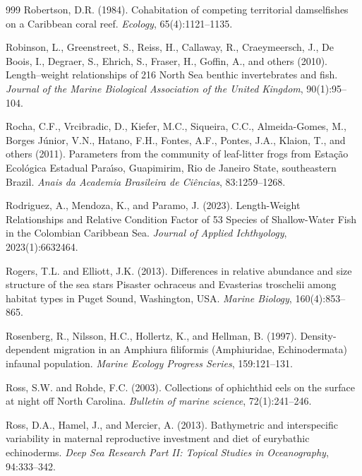 \begin{thebibliography}{999}
Robertson, D.R. (1984). Cohabitation of competing territorial damselfishes on a Caribbean coral reef. \textit{Ecology}, 65(4):1121--1135.

Robinson, L., Greenstreet, S., Reiss, H., Callaway, R., Craeymeersch, J., De Boois, I., Degraer, S., Ehrich, S., Fraser, H., Goffin, A., and others (2010). Length--weight relationships of 216 North Sea benthic invertebrates and fish. \textit{Journal of the Marine Biological Association of the United Kingdom}, 90(1):95--104.

Rocha, C.F., Vrcibradic, D., Kiefer, M.C., Siqueira, C.C., Almeida-Gomes, M., Borges J{\'u}nior, V.N., Hatano, F.H., Fontes, A.F., Pontes, J.A., Klaion, T., and others (2011). Parameters from the community of leaf-litter frogs from Esta{\c{c}}{\~a}o Ecol{\'o}gica Estadual Para{\'\i}so, Guapimirim, Rio de Janeiro State, southeastern Brazil. \textit{Anais da Academia Brasileira de Ci{\^e}ncias}, 83:1259--1268.

Rodriguez, A., Mendoza, K., and Paramo, J. (2023). Length-Weight Relationships and Relative Condition Factor of 53 Species of Shallow-Water Fish in the Colombian Caribbean Sea. \textit{Journal of Applied Ichthyology}, 2023(1):6632464.

Rogers, T.L. and Elliott, J.K. (2013). Differences in relative abundance and size structure of the sea stars Pisaster ochraceus and Evasterias troschelii among habitat types in Puget Sound, Washington, USA. \textit{Marine Biology}, 160(4):853--865.

Rosenberg, R., Nilsson, H.C., Hollertz, K., and Hellman, B. (1997). Density-dependent migration in an Amphiura filiformis (Amphiuridae, Echinodermata) infaunal population. \textit{Marine Ecology Progress Series}, 159:121--131.

Ross, S.W. and Rohde, F.C. (2003). Collections of ophichthid eels on the surface at night off North Carolina. \textit{Bulletin of marine science}, 72(1):241--246.

Ross, D.A., Hamel, J., and Mercier, A. (2013). Bathymetric and interspecific variability in maternal reproductive investment and diet of eurybathic echinoderms. \textit{Deep Sea Research Part II: Topical Studies in Oceanography}, 94:333--342.


\end{thebibliography}
